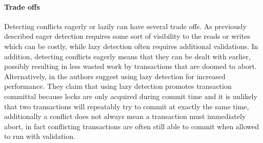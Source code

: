 \paragraph{Trade offs}
Detecting conflicts eagerly or lazily can have several trade offs.
As previously described eager detection requires some sort of visibility to the reads or writes
which can be costly, while lazy detection often requires additional validations.
In addition, detecting conflicts eagerly means that they can be dealt with earlier,
possibly resulting in less wasted work by transactions that are doomed to abort.
Alternatively, in \cite{1504199} the authors suggest using lazy detection for increased performance.
They claim that using lazy detection promotes transaction committal because locks are only acquired during commit time and it
is unlikely that two transactions will repeatably try to commit at exactly the same time,
additionally a conflict does not always mean a transaction must immediately abort,
in fact conflicting transactions are often still able to commit when allowed to run with validation.


